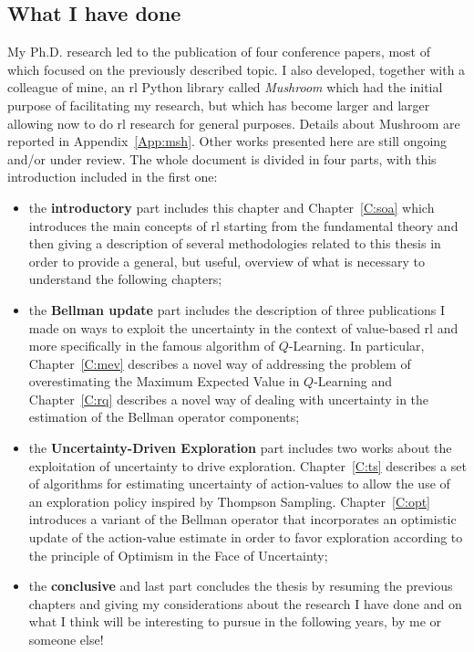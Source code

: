 \subsection{What I have done}
My Ph.D. research led to the publication of four conference papers, most of which focused on the previously described topic. I also developed, together with a colleague of mine, an \gls{rl} Python library called \textit{Mushroom} which had the initial purpose of facilitating my research, but which has become larger and larger allowing now to do \gls{rl} research for general purposes. Details about Mushroom are reported in Appendix~\ref{App:msh}. Other works presented here are still ongoing and/or under review. The whole document is divided in four parts, with this introduction included in the first one:
\begin{itemize}
 \item the \textbf{introductory} part includes this chapter and Chapter~\ref{C:soa} which introduces the main concepts of \gls{rl} starting from the fundamental theory and then giving a description of several methodologies related to this thesis in order to provide a general, but useful, overview of what is necessary to understand the following chapters;
 \item the \textbf{Bellman update} part includes the description of three publications I made on ways to exploit the uncertainty in the context of value-based \gls{rl} and more specifically in the famous algorithm of $Q$-Learning. In particular, Chapter~\ref{C:mev} describes a novel way of addressing the problem of overestimating the Maximum Expected Value in $Q$-Learning and Chapter~\ref{C:rq} describes a novel way of dealing with uncertainty in the estimation of the Bellman operator components;
 \item the \textbf{Uncertainty-Driven Exploration} part includes two works about the exploitation of uncertainty to drive exploration. Chapter~\ref{C:ts} describes a set of algorithms for estimating uncertainty of action-values to allow the use of an exploration policy inspired by Thompson Sampling. Chapter~\ref{C:opt} introduces a variant of the Bellman operator that incorporates an optimistic update of the action-value estimate in order to favor exploration according to the principle of Optimism in the Face of Uncertainty;
 \item the \textbf{conclusive} and last part concludes the thesis by resuming the previous chapters and giving my considerations about the research I have done and on what I think will be interesting to pursue in the following years, by me or someone else!
\end{itemize}
